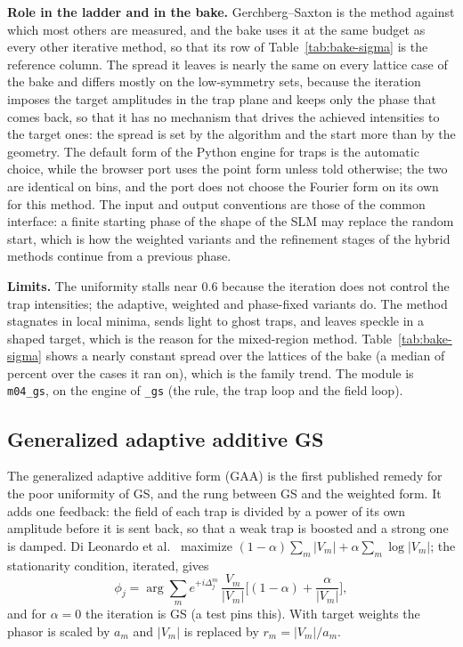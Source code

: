 \textbf{Role in the ladder and in the bake.} Gerchberg--Saxton is the method against which most others are measured, and the bake uses it at the same budget as every other iterative method, so that its row of Table~\ref{tab:bake-sigma} is the reference column. The spread it leaves is nearly the same on every lattice case of the bake and differs mostly on the low-symmetry sets, because the iteration imposes the target amplitudes in the trap plane and keeps only the phase that comes back, so that it has no mechanism that drives the achieved intensities to the target ones: the spread is set by the algorithm and the start more than by the geometry. The default form of the Python engine for traps is the automatic choice, while the browser port uses the point form unless told otherwise; the two are identical on bins, and the port does not choose the Fourier form on its own for this method. The input and output conventions are those of the common interface: a finite starting phase of the shape of the SLM may replace the random start, which is how the weighted variants and the refinement stages of the hybrid methods continue from a previous phase.

\textbf{Limits.} The uniformity stalls near 0.6 because the iteration does not control the trap intensities; the adaptive, weighted and phase-fixed variants do. The method stagnates in local minima, sends light to ghost traps, and leaves speckle in a shaped target, which is the reason for the mixed-region method. Table~\ref{tab:bake-sigma} shows a nearly constant spread over the lattices of the bake (a median of  percent over the cases it ran on), which is the family trend. The module is \texttt{m04\_gs}, on the engine of \texttt{\_gs} (the rule, the trap loop and the field loop).

\subsection{Generalized adaptive additive GS}\label{sec:m05}

The generalized adaptive additive form (GAA) is the first published remedy for the poor uniformity of GS, and the rung between GS and the weighted form. It adds one feedback: the field of each trap is divided by a power of its own amplitude before it is sent back, so that a weak trap is boosted and a strong one is damped. Di Leonardo et al.~\cite{dileonardo} maximize $(1-\alpha)\sum_m|V_m|+\alpha\sum_m\log|V_m|$; the stationarity condition, iterated, gives
\begin{equation}
\phi_j=\arg\sum_m e^{+i\Delta_j^m}\,\frac{V_m}{|V_m|}\Big[(1-\alpha)+\frac{\alpha}{|V_m|}\Big],
\label{eq:m05}
\end{equation}
and for $\alpha=0$ the iteration is GS (a test pins this). With target weights the phasor is scaled by $a_m$ and $|V_m|$ is replaced by $r_m=|V_m|/a_m$.

